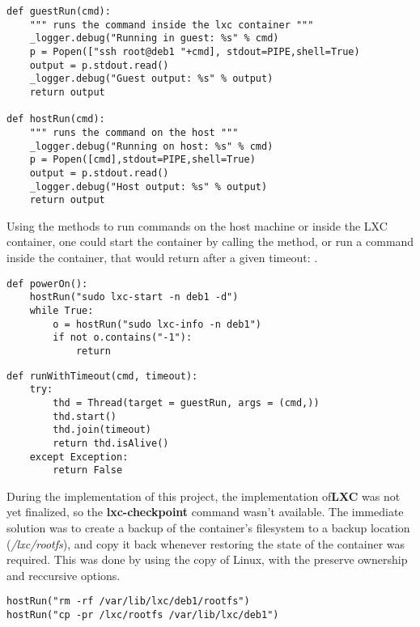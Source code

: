 \lstset{caption=Running Commands,language=python,label=lst:lxc-commands}
\begin{lstlisting}
def guestRun(cmd):
    """ runs the command inside the lxc container """
    _logger.debug("Running in guest: %s" % cmd)
    p = Popen(["ssh root@deb1 "+cmd], stdout=PIPE,shell=True)
    output = p.stdout.read()
    _logger.debug("Guest output: %s" % output)
    return output

def hostRun(cmd):
    """ runs the command on the host """
    _logger.debug("Running on host: %s" % cmd)
    p = Popen([cmd],stdout=PIPE,shell=True)
    output = p.stdout.read()
    _logger.debug("Host output: %s" % output)
    return output
\end{lstlisting}

Using the methods to run commands on the host machine or inside the 
LXC container, one could start the container by calling the 
 method, or run a command inside the container,
that would return after a given timeout: .

\lstset{caption=Method Called to Power on the Container,language=python,label=lst:lxc-poweron}
\begin{lstlisting}
def powerOn():
    hostRun("sudo lxc-start -n deb1 -d")
    while True:
        o = hostRun("sudo lxc-info -n deb1")
        if not o.contains("-1"):
            return
\end{lstlisting}


\lstset{caption=Method That Runs a Command Inside the Container,language=python,label=lst:lxc-runtimeout}
\begin{lstlisting}
def runWithTimeout(cmd, timeout):
    try:
        thd = Thread(target = guestRun, args = (cmd,))
        thd.start()
        thd.join(timeout)
        return thd.isAlive()
    except Exception:
        return False
\end{lstlisting}

During the implementation of this project, the implementation of\textbf{LXC} was 
not yet finalized, so the \textbf{lxc-checkpoint} command wasn't available. 
The immediate solution was to create a backup of the container's filesystem to a 
backup location (\textit{/lxc/rootfs}), and copy it back whenever 
restoring the state of the container was required. This was done by using the
copy  of Linux, with the preserve ownership and
reccursive options.

\lstset{caption=Restoring the Contaier to a Previous State, language=python, label=lst:lxc-restore}
\begin{lstlisting}
hostRun("rm -rf /var/lib/lxc/deb1/rootfs")
hostRun("cp -pr /lxc/rootfs /var/lib/lxc/deb1")
\end{lstlisting}

